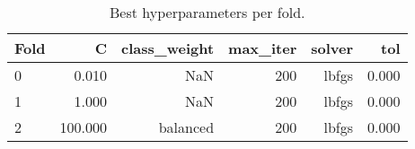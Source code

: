 \begin{table}
\caption{Best hyperparameters per fold.}
\label{tab:hyperparams}
\begin{tabular}{lrrrrr}
\toprule
Fold & C & class\_weight & max\_iter & solver & tol \\
\midrule
0 & 0.010 & NaN & 200 & lbfgs & 0.000 \\
1 & 1.000 & NaN & 200 & lbfgs & 0.000 \\
2 & 100.000 & balanced & 200 & lbfgs & 0.000 \\
\bottomrule
\end{tabular}
\end{table}
